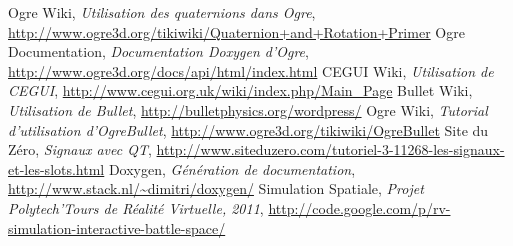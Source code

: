 \documentclass[frenchb,twoside]{EPURapport}
\begin{document}
\begin{bibliographie}	
	 Ogre Wiki, \textit{Utilisation des quaternions dans Ogre}, \url{http://www.ogre3d.org/tikiwiki/Quaternion+and+Rotation+Primer}
	 Ogre Documentation, \textit{Documentation Doxygen d'Ogre}, \url{http://www.ogre3d.org/docs/api/html/index.html}
	 CEGUI Wiki, \textit{Utilisation de CEGUI}, \url{http://www.cegui.org.uk/wiki/index.php/Main_Page}
	 Bullet Wiki, \textit{Utilisation de Bullet}, \url{http://bulletphysics.org/wordpress/}
	 Ogre Wiki, \textit{Tutorial d'utilisation d'OgreBullet}, \url{http://www.ogre3d.org/tikiwiki/OgreBullet}
	 Site du Zéro, \textit{Signaux avec QT}, \url{http://www.siteduzero.com/tutoriel-3-11268-les-signaux-et-les-slots.html}
	 Doxygen, \textit{Génération de documentation}, \url{http://www.stack.nl/~dimitri/doxygen/}
	 Simulation Spatiale, \textit{Projet Polytech'Tours de Réalité Virtuelle, 2011}, \url{http://code.google.com/p/rv-simulation-interactive-battle-space/}
	\end{bibliographie}	
\end{document}
